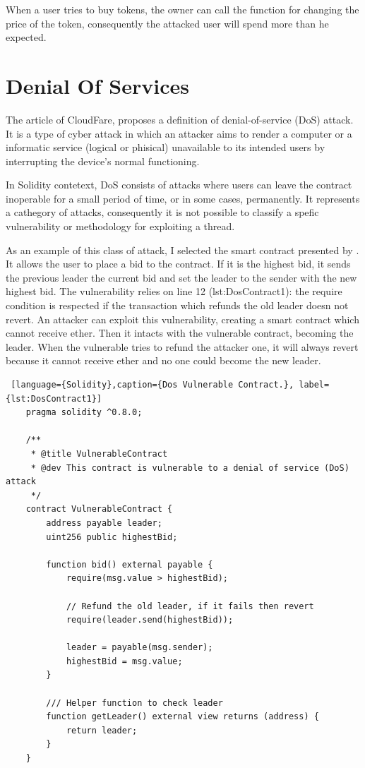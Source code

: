 When a user tries to buy tokens, the owner can call the function for changing the price of the token, consequently the attacked user will spend more than he expected.
 

\section{Denial Of Services}

The article \citet{CloudFareDos} of CloudFare, proposes a definition of denial-of-service (DoS) attack. It is a type of cyber attack in 
which an attacker aims to render a computer or a informatic service (logical or phisical) unavailable to its intended users by interrupting the 
device's normal functioning. 

In Solidity contetext, DoS consists of attacks where 
users can leave the contract inoperable for a small period of time, or in some cases, permanently.
It represents a cathegory of attacks, consequently it is not possible to classify a 
spefic vulnerability or methodology for exploiting a thread.

As an example of this class of attack, I selected the smart contract presented by \citet{Dos1}. 
It allows the user to place a bid to the contract. If it is the highest bid, it 
sends the previous leader the current bid and set the leader to the sender with the new highest bid.
The vulnerability relies on line 12 (\refname{lst:DosContract1}): the require condition is respected if the transaction which refunds the old leader doesn not revert. 
An attacker can exploit this vulnerability, creating a smart contract which cannot receive ether. Then it intacts with the vulnerable contract, becoming the leader.
When the vulnerable tries to refund the attacker one, it will always revert because it cannot receive ether and no one could become the new leader.

\begin{lstlisting} [language={Solidity},caption={Dos Vulnerable Contract.}, label={lst:DosContract1}]
    pragma solidity ^0.8.0;

    /**
     * @title VulnerableContract
     * @dev This contract is vulnerable to a denial of service (DoS) attack
     */
    contract VulnerableContract {
        address payable leader;
        uint256 public highestBid;
    
        function bid() external payable {
            require(msg.value > highestBid);
    
            // Refund the old leader, if it fails then revert
            require(leader.send(highestBid));
    
            leader = payable(msg.sender);
            highestBid = msg.value;
        }
    
        /// Helper function to check leader
        function getLeader() external view returns (address) {
            return leader;
        }
    }
    
\end{lstlisting}

